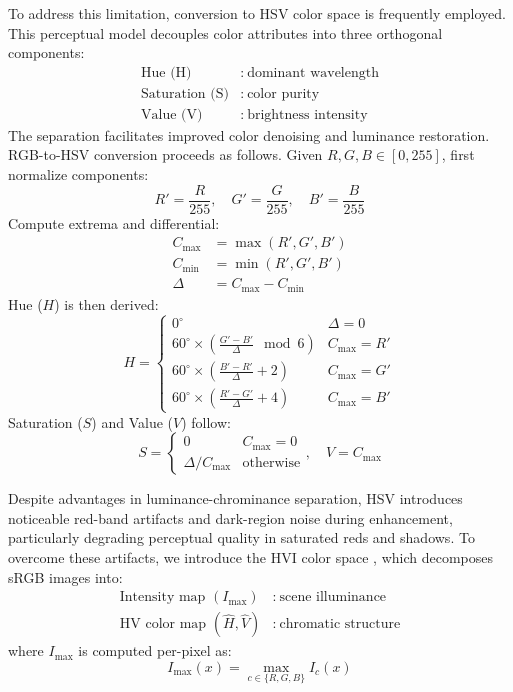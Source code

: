 \documentclass[journal]{IEEEtran}
\begin{document}
To address this limitation, conversion to HSV color space is frequently employed. This perceptual model decouples color attributes into three orthogonal components:
\begin{align}
\text{Hue (H)} &:\ \text{dominant wavelength} \\
\text{Saturation (S)} &:\ \text{color purity} \\
\text{Value (V)} &:\ \text{brightness intensity}
\end{align}
The separation facilitates improved color denoising and luminance restoration. RGB-to-HSV conversion proceeds as follows. Given $R, G, B \in [0, 255]$, first normalize components:
\begin{equation}
R' = \frac{R}{255}, \quad G' = \frac{G}{255}, \quad B' = \frac{B}{255}
\end{equation}
Compute extrema and differential:
\begin{align}
C_{\text{max}} &= \max(R', G', B') \\
C_{\text{min}} &= \min(R', G', B') \\
\Delta &= C_{\text{max}} - C_{\text{min}}
\end{align}
Hue ($H$) is then derived:
\begin{equation}
H = 
\begin{cases}
0^\circ & \Delta = 0 \\
60^\circ \times \left( \frac{G' - B'}{\Delta} \mod 6 \right) & C_{\text{max}} = R' \\
60^\circ \times \left( \frac{B' - R'}{\Delta} + 2 \right) & C_{\text{max}} = G' \\
60^\circ \times \left( \frac{R' - G'}{\Delta} + 4 \right) & C_{\text{max}} = B'
\end{cases}
\end{equation}
Saturation ($S$) and Value ($V$) follow:
\begin{equation}
S = 
\begin{cases}
0 & C_{\text{max}} = 0 \\
\Delta / C_{\text{max}} & \text{otherwise}
\end{cases}, \quad
V = C_{\text{max}}
\end{equation}

Despite advantages in luminance-chrominance separation, HSV introduces noticeable red-band artifacts and dark-region noise during enhancement, particularly degrading perceptual quality in saturated reds and shadows. To overcome these artifacts, we introduce the HVI color space \cite{yan2025hvi}, which decomposes sRGB images into:
\begin{align}
\text{Intensity map } (I_{\text{max}}) &:\ \text{scene illuminance} \\
\text{HV color map } (\hat{H},\hat{V}) &:\ \text{chromatic structure}
\end{align}
where $I_{\text{max}}$ is computed per-pixel as:
\begin{equation}
I_{\text{max}}(x) = \max\limits_{c \in \{R,G,B\}} I_c(x)
\end{equation}
\end{document}
